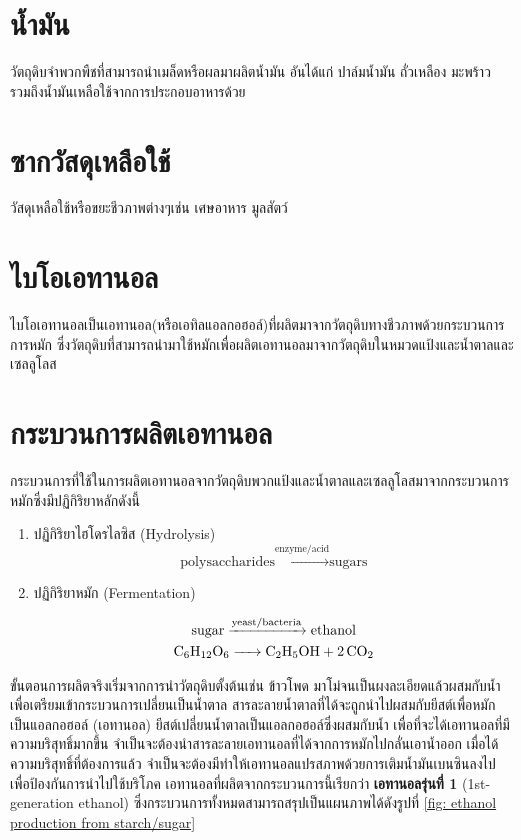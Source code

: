 \documentclass[a4paper,nobib,openany,10pt]{tufte-book}
\begin{document}
\section{น้ำมัน}
\label{sec:org33490e3}
วัตถุดิบจำพวกพืชที่สามารถนำเมล็ดหรือผลมาผลิตน้ำมัน อันได้แก่ ปาล์มน้ำมัน
ถั่วเหลือง มะพร้าว รวมถึงน้ำมันเหลือใช้จากการประกอบอาหารด้วย

\section{ซากวัสดุเหลือใช้}
\label{sec:orgba4f152}
วัสดุเหลือใช้หรือขยะชีวภาพต่างๆเช่น เศษอาหาร มูลสัตว์

\section{ไบโอเอทานอล}
\label{sec:org11a6436}
ไบโอเอทานอลเป็นเอทานอล(หรือเอทิลแอลกอฮอล์)ที่ผลิตมาจากวัตถุดิบทางชีวภาพด้วยกระบวนการการหมัก
ซึ่งวัตถุดิบที่สามารถนำมาใช้หมักเพื่อผลิตเอทานอลมาจากวัตถุดิบในหมวดแป้งและน้ำตาลและเซลลูโลส

\section{กระบวนการผลิตเอทานอล}
\label{sec:org30472c1}
กระบวนการที่ใช้ในการผลิตเอทานอลจากวัตถุดิบพวกแป้งและน้ำตาลและเซลลูโลสมาจากกระบวนการหมักซึ่งมีปฏิกิริยาหลักดังนี้

\begin{enumerate}
\item ปฏิกิริยาไฮโดรไลซิส (Hydrolysis)
\[\text{polysaccharides} \xrightarrow{\text{enzyme/acid}} \text{sugars}\]

\item ปฏิกิริยาหมัก (Fermentation)

\begin{gather*}
\label{eq: fermentation polysac}
  \text{sugar} \xrightarrow{\text{yeast/bacteria}} \text{ethanol} \\
  \ce{C6H12O6 -> C2H5OH + 2 CO2}
\end{gather*}
\end{enumerate}

ขั้นตอนการผลิตจริงเริ่มจากการนำวัตถุดิบตั้งต้นเช่น ข้าวโพด
มาโม่จนเป็นผงละเอียดแล้วผสมกับน้ำเพื่อเตรียมเข้ากระบวนการเปลี่ยนเป็นน้ำตาล
สารละลายน้ำตาลที่ได้จะถูกนำไปผสมกับยีสต์เพื่อหมักเป็นแอลกอฮอล์ (เอทานอล)
ยีสต์เปลี่ยนน้ำตาลเป็นแอลกอฮอล์ซึ่งผสมกับน้ำ
เพื่อที่จะได้เอทานอลที่มีความบริสุทธิ์มากขึ้น
จำเป็นจะต้องนำสารละลายเอทานอลที่ได้จากการหมักไปกลั่นเอาน้ำออก
เมื่อได้ความบริสุทธิ์ที่ต้องการแล้ว
จำเป็นจะต้องมีทำให้เอทานอลแปรสภาพด้วยการเติมน้ำมันเบนซินลงไปเพื่อป้องกันการนำไปใช้บริโภค
เอทานอลที่ผลิตจากกระบวนการนี้เรียกว่า \textbf{เอทานอลรุ่นที่ 1} (1st-generation
ethanol) ซึ่งกระบวนการทั้งหมดสามารถสรุปเป็นแผนภาพได้ดังรูปที่
\ref{fig: ethanol production from starch/sugar}
\end{document}
